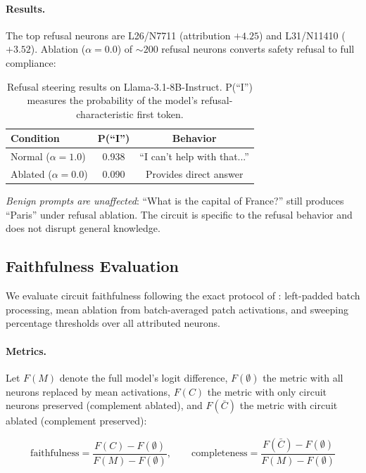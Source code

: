 \documentclass[11pt]{article}
\begin{document}
\paragraph{Results.}
The top refusal neurons are L26/N7711 (attribution $+4.25$) and L31/N11410 ($+3.52$).
Ablation ($\alpha{=}0.0$) of ${\sim}200$ refusal neurons converts safety refusal to full compliance:

\begin{table}[ht]
\centering
\caption{Refusal steering results on Llama-3.1-8B-Instruct. P(``I'') measures the probability of the model's refusal-characteristic first token.}
\label{tab:refusal}
\begin{tabular}{lcc}
\toprule
\textbf{Condition} & \textbf{P(``I'')} & \textbf{Behavior} \\
\midrule
Normal ($\alpha{=}1.0$)  & 0.938 & ``I can't help with that...'' \\
Ablated ($\alpha{=}0.0$) & 0.090 & Provides direct answer \\
\bottomrule
\end{tabular}
\end{table}

\emph{Benign prompts are unaffected}: ``What is the capital of France?'' still produces ``Paris'' under refusal ablation.
The circuit is specific to the refusal behavior and does not disrupt general knowledge.

\subsection{Faithfulness Evaluation}
\label{sec:faithfulness}

We evaluate circuit faithfulness following the exact protocol of \citet{arora2025circuits}: left-padded batch processing, mean ablation from batch-averaged patch activations, and sweeping percentage thresholds over all attributed neurons.

\paragraph{Metrics.}
Let $F(M)$ denote the full model's logit difference, $F(\emptyset)$ the metric with all neurons replaced by mean activations, $F(C)$ the metric with only circuit neurons preserved (complement ablated), and $F(\bar{C})$ the metric with circuit ablated (complement preserved):

\begin{equation}
    \text{faithfulness} = \frac{F(C) - F(\emptyset)}{F(M) - F(\emptyset)}, \qquad
    \text{completeness} = \frac{F(\bar{C}) - F(\emptyset)}{F(M) - F(\emptyset)}
\end{equation}
\end{document}
